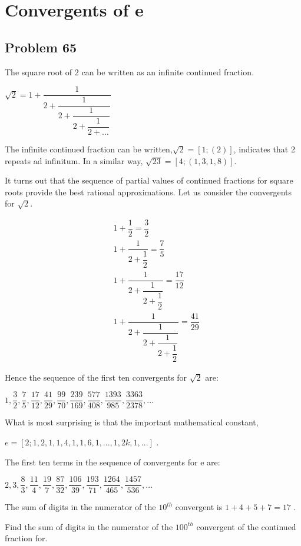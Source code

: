 \chapter{Convergents of e}
\section{Problem 65}
The square root of 2 can be written as an infinite continued fraction.

$\sqrt{2} = 1 + \dfrac{1}{2 + \dfrac{1}{2 + \dfrac{1}{2 + \dfrac{1}{2 + ...}}}}$

The infinite continued fraction can be written,$\sqrt{2} = [1; (2)]$, indicates that 2 repeats ad infinitum. In a
similar way, $\sqrt{23} = [4; (1, 3, 1, 8)]$.

It turns out that the sequence of partial values of continued fractions for square roots provide the best rational
approximations. Let us consider the convergents for $\sqrt{2}$.

\begin{align*}
&1 + \dfrac{1}{2} = \dfrac{3}{2} \\
&1 + \dfrac{1}{2 + \dfrac{1}{2}} = \dfrac{7}{5}\\
&1 + \dfrac{1}{2 + \dfrac{1}{2 + \dfrac{1}{2}}} = \dfrac{17}{12}\\
&1 + \dfrac{1}{2 + \dfrac{1}{2 + \dfrac{1}{2 + \dfrac{1}{2}}}} = \dfrac{41}{29}
\end{align*}

Hence the sequence of the first ten convergents for $\sqrt{2}$ are:

$1, \dfrac{3}{2}, \dfrac{7}{5}, \dfrac{17}{12}, \dfrac{41}{29}, \dfrac{99}{70}, \dfrac{239}{169}, \dfrac{577}{408},
\dfrac{1393}{985}, \dfrac{3363}{2378}, ...$

What is most surprising is that the important mathematical constant,

$e = [2; 1, 2, 1, 1, 4, 1, 1, 6, 1, ... , 1, 2k, 1, ...]$ .

The first ten terms in the sequence of convergents for e are:

$2, 3, \dfrac{8}{3}, \dfrac{11}{4}, \dfrac{19}{7}, \dfrac{87}{32}, \dfrac{106}{39}, \dfrac{193}{71}, \dfrac{1264}{465},
\dfrac{1457}{536}, ...$

The sum of digits in the numerator of the $10^{th}$ convergent is $1 + 4 + 5 + 7 = 17$ .

Find the sum of digits in the numerator of the $100^{th}$ convergent of the continued fraction for.
